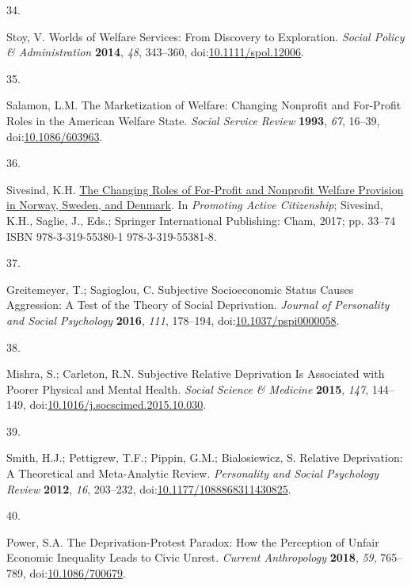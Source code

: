 \documentclass[
  12pt,
  letterpaper,
]{article}
\newlength{\cslhangindent}
\newlength{\csllabelwidth}
\newenvironment{CSLReferences}[2] %
 {\begin{list}{}{%
  \setlength{\itemindent}{0pt}
  \setlength{\leftmargin}{0pt}
  \setlength{\parsep}{0pt}
  \ifodd #1
   \setlength{\leftmargin}{\cslhangindent}
   \setlength{\itemindent}{-1\cslhangindent}
  \fi
  \setlength{\itemsep}{#2\baselineskip}}}
 {\end{list}}
\newcommand{\CSLLeftMargin}[1]{\parbox[t]{\csllabelwidth}{\strut#1\strut}}
\newcommand{\CSLRightInline}[1]{\parbox[t]{\linewidth - \csllabelwidth}{\strut#1\strut}}
\begin{document}
\begin{CSLReferences}{0}{0}
\CSLLeftMargin{34. }%
\CSLRightInline{Stoy, V. Worlds of {Welfare Services}: {From Discovery}
to {Exploration}. \emph{Social Policy \& Administration} \textbf{2014},
\emph{48}, 343--360,
doi:\href{https://doi.org/10.1111/spol.12006}{10.1111/spol.12006}.}

\CSLLeftMargin{35. }%
\CSLRightInline{Salamon, L.M. The {Marketization} of {Welfare}:
{Changing Nonprofit} and {For-Profit Roles} in the {American Welfare
State}. \emph{Social Service Review} \textbf{1993}, \emph{67}, 16--39,
doi:\href{https://doi.org/10.1086/603963}{10.1086/603963}.}

\CSLLeftMargin{36. }%
\CSLRightInline{Sivesind, K.H.
\href{https://doi.org/10.1007/978-3-319-55381-8_2}{The {Changing Roles}
of {For-Profit} and {Nonprofit Welfare Provision} in {Norway}, {Sweden},
and {Denmark}}. In \emph{Promoting {Active Citizenship}}; Sivesind,
K.H., Saglie, J., Eds.; Springer International Publishing: Cham, 2017;
pp. 33--74 ISBN 978-3-319-55380-1 978-3-319-55381-8.}

\CSLLeftMargin{37. }%
\CSLRightInline{Greitemeyer, T.; Sagioglou, C. Subjective Socioeconomic
Status Causes Aggression: {A} Test of the Theory of Social Deprivation.
\emph{Journal of Personality and Social Psychology} \textbf{2016},
\emph{111}, 178--194,
doi:\href{https://doi.org/10.1037/pspi0000058}{10.1037/pspi0000058}.}

\CSLLeftMargin{38. }%
\CSLRightInline{Mishra, S.; Carleton, R.N. Subjective Relative
Deprivation Is Associated with Poorer Physical and Mental Health.
\emph{Social Science \& Medicine} \textbf{2015}, \emph{147}, 144--149,
doi:\href{https://doi.org/10.1016/j.socscimed.2015.10.030}{10.1016/j.socscimed.2015.10.030}.}

\CSLLeftMargin{39. }%
\CSLRightInline{Smith, H.J.; Pettigrew, T.F.; Pippin, G.M.;
Bialosiewicz, S. Relative {Deprivation}: {A Theoretical} and
{Meta-Analytic Review}. \emph{Personality and Social Psychology Review}
\textbf{2012}, \emph{16}, 203--232,
doi:\href{https://doi.org/10.1177/1088868311430825}{10.1177/1088868311430825}.}

\CSLLeftMargin{40. }%
\CSLRightInline{Power, S.A. The {Deprivation-Protest Paradox}: {How} the
{Perception} of {Unfair Economic Inequality Leads} to {Civic Unrest}.
\emph{Current Anthropology} \textbf{2018}, \emph{59}, 765--789,
doi:\href{https://doi.org/10.1086/700679}{10.1086/700679}.}


\end{CSLReferences}
\end{document}
